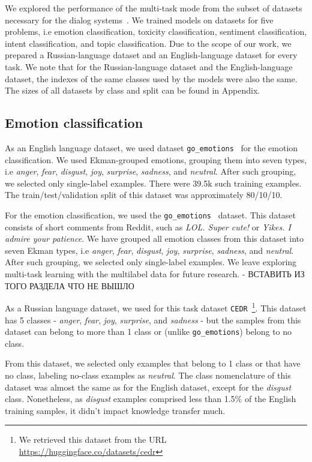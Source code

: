 We explored the performance of the multi-task mode from the subset of datasets necessary for the dialog systems~\cite{wochat,lrec}. We trained models on datasets for five problems, i.e emotion classification, toxicity classification, sentiment classification, intent classification, and topic classification. Due to the scope of our work, we prepared a Russian-language dataset and an English-language dataset for every task. We note that for the Russian-language dataset and the English-language dataset, the indexes of the same classes used by the models were also the same. The sizes of all datasets by class and split can be found in Appendix. 

\subsection{Emotion classification }

As an English language dataset, we used dataset \texttt{go\_emotions}~\cite{emotions} for the emotion classification. We used Ekman-grouped emotions, grouping them into seven types, i.e \textit{anger}, \textit{fear}, \textit{disgust}, \textit{joy}, \textit{surprise}, \textit{sadness}, and \textit{neutral}. After such grouping, we selected only single-label examples. There were 39.5k such training examples. The train/test/validation split of this dataset was approximately 80/10/10.


For the emotion classification, we used the \texttt{go\_emotions}~\cite{emotions} dataset. This dataset consists of short comments from Reddit, such as \textit{LOL. Super cute!} or \textit{Yikes. I admire your patience}. We have grouped all emotion classes from this dataset into seven Ekman types, i.e \textit{anger}, \textit{fear}, \textit{disgust}, \textit{joy}, \textit{surprise}, \textit{sadness}, and \textit{neutral}. After such grouping, we selected only single-label examples. We leave exploring multi-task learning with the multilabel data for future research. - ВСТАВИТЬ ИЗ ТОГО РАЗДЕЛА ЧТО НЕ ВЫШЛО

As a Russian language dataset, we used for this task dataset \texttt{CEDR}~\cite{ru_emotions}\footnote{We retrieved this dataset from the URL \url{https://huggingface.co/datasets/cedr}}. This dataset has 5 classes - \textit{anger}, \textit{fear}, \textit{joy}, \textit{surprise}, and \textit{sadness} - but the samples from this dataset can belong to more than 1 class or (unlike \texttt{go\_emotions}) belong to no class. 

From this dataset, we selected only examples that belong to 1 class or that have no class, labeling no-class examples as \textit{neutral}. The class nomenclature of this dataset was almost the same as for the English dataset, except for the \textit{disgust} class. Nonetheless, as \textit{disgust} examples comprised less than 1.5\% of the English training samples, it didn't impact knowledge transfer much.

